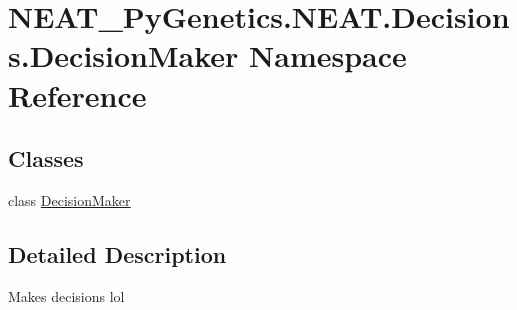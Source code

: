 \hypertarget{namespace_n_e_a_t___py_genetics_1_1_n_e_a_t_1_1_decisions_1_1_decision_maker}{}\section{N\+E\+A\+T\+\_\+\+Py\+Genetics.\+N\+E\+A\+T.\+Decisions.\+Decision\+Maker Namespace Reference}
\label{namespace_n_e_a_t___py_genetics_1_1_n_e_a_t_1_1_decisions_1_1_decision_maker}
\subsection*{Classes}
\begin{DoxyCompactItemize}
\item 
class \hyperlink{class_n_e_a_t___py_genetics_1_1_n_e_a_t_1_1_decisions_1_1_decision_maker_1_1_decision_maker}{Decision\+Maker}
\end{DoxyCompactItemize}


\subsection{Detailed Description}
\begin{DoxyVerb}Makes decisions lol
\end{DoxyVerb}
 